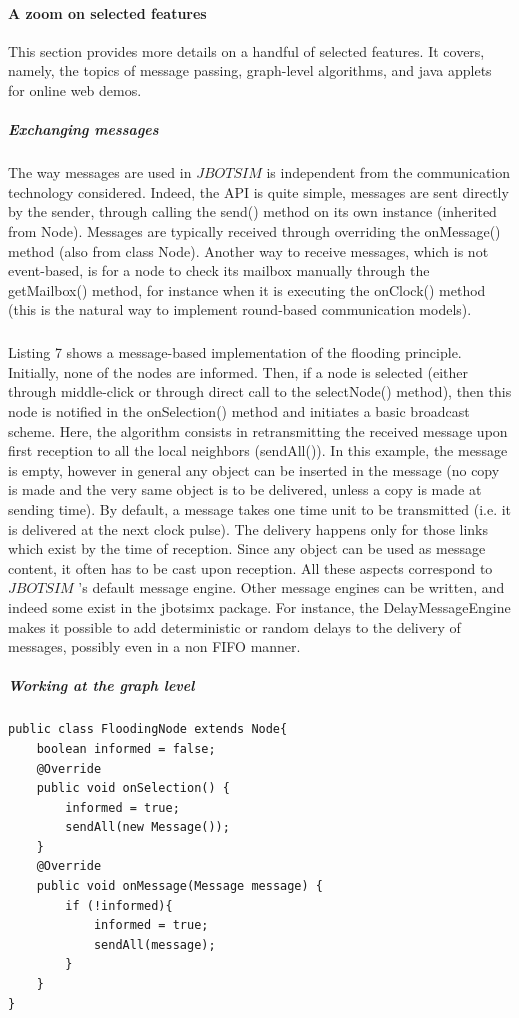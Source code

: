 \paragraph{A zoom on selected features}This section provides more details on a handful of selected features. It covers, namely, the topics of message passing, graph-level algorithms, and java applets for online web demos.
\subparagraph{Exchanging messages}The way messages are used in $JBOTSIM$ is independent from the communication technology considered. Indeed, the API is quite simple, messages are sent directly by the sender, through calling the send() method on its own instance (inherited from Node). Messages are typically received through overriding the onMessage() method (also from class Node). Another way to receive messages, which is not event-based, is for a node to check its mailbox manually through the getMailbox() method, for instance when it is executing the onClock() method (this is the natural way to implement round-based communication models). \subparagraph{}Listing 7 shows a message-based implementation of the flooding principle. Initially, none of the nodes are informed. Then, if a node is selected (either through middle-click or through direct call to the selectNode() method), then this node is notified in the onSelection() method and initiates a basic broadcast scheme. Here, the algorithm consists in retransmitting the received message upon first reception to all the local neighbors (sendAll()). In this example, the message is empty, however in general any object can be inserted in the message (no copy is made and the very same object is to be delivered, unless a copy is made at sending time). By default, a message takes one time unit to be transmitted (i.e. it is delivered at the next clock pulse). The delivery happens only for those links which exist by the time of reception. Since any object can be used as message content, it often has to be cast upon reception. All these aspects correspond to  $JBOTSIM$ ’s default message engine. Other message engines can be written, and indeed some exist in the jbotsimx package. For instance, the DelayMessageEngine makes it possible to add deterministic or random delays to the delivery of messages, possibly even in a non FIFO manner.
\subparagraph{Working at the graph level}
\begin{lstlisting}[caption=Example of message passing algorithm, captionpos=b]
public class FloodingNode extends Node{
	boolean informed = false;
	@Override 
	public void onSelection() {
		informed = true;
		sendAll(new Message());
	}
	@Override
	public void onMessage(Message message) {
		if (!informed){
			informed = true;
			sendAll(message);
		}
	}
}
\end{lstlisting}
